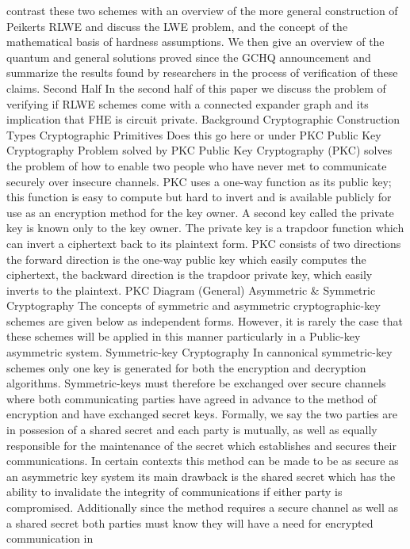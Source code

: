 contrast these two schemes with an overview of the more general
construction of Peikerts RLWE and discuss the LWE problem, and the
concept of the mathematical basis of hardness assumptions. We then give
an overview of the quantum and general solutions proved since the GCHQ
announcement and summarize the results found by researchers in the
process of verification of these claims. Second Half In the second half
of this paper we discuss the problem of verifying if RLWE schemes come
with a connected expander graph and its implication that FHE is circuit
private. Background Cryptographic Construction Types Cryptographic
Primitives Does this go here or under PKC Public Key Cryptography
Problem solved by PKC Public Key Cryptography (PKC) solves the problem
of how to enable two people who have never met to communicate securely
over insecure channels. PKC uses a one-way function as its public key;
this function is easy to compute but hard to invert and is available
publicly for use as an encryption method for the key owner. A second
key called the private key is known only to the key owner. The private
key is a trapdoor function which can invert a ciphertext back to its
plaintext form. PKC consists of two directions the forward direction is
the one-way public key which easily computes the ciphertext, the
backward direction is the trapdoor private key, which easily inverts to
the plaintext. PKC Diagram (General) Asymmetric & Symmetric
Cryptography The concepts of symmetric and asymmetric cryptographic-key
schemes are given below as independent forms. However, it is rarely the
case that these schemes will be applied in this manner particularly in
a Public-key asymmetric system. Symmetric-key Cryptography In
cannonical symmetric-key schemes only one key is generated for both the
encryption and decryption algorithms. Symmetric-keys must therefore be
exchanged over secure channels where both communicating parties have
agreed in advance to the method of encryption and have exchanged secret
keys. Formally, we say the two parties are in possesion of a shared
secret and each party is mutually, as well as equally responsible for
the maintenance of the secret which establishes and secures their
communications. In certain contexts this method can be made to be as
secure as an asymmetric key system its main drawback is the shared
secret which has the ability to invalidate the integrity of
communications if either party is compromised. Additionally since the
method requires a secure channel as well as a shared secret both
parties must know they will have a need for encrypted communication in
